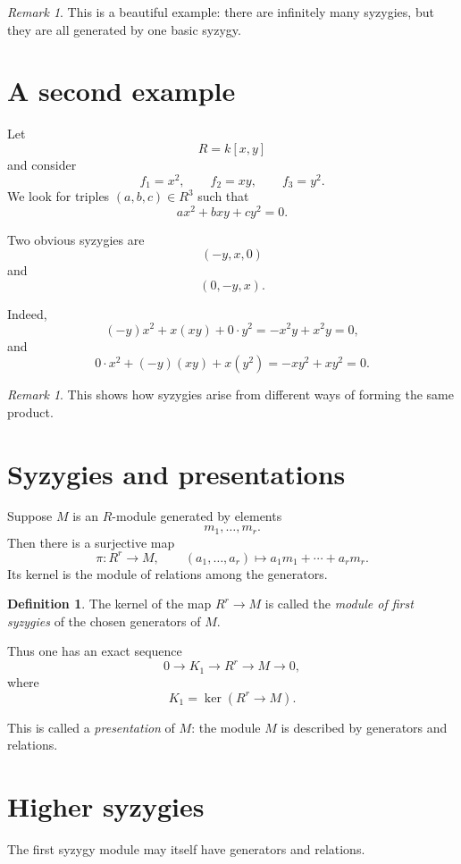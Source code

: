 \documentclass[11pt]{article}
\theoremstyle{definition}
\newtheorem{definition}[theorem]{Definition}
\theoremstyle{remark}
\newtheorem{remark}[theorem]{Remark}
\newcommand{\kerR}{\operatorname{ker}}
\begin{document}
	\begin{remark}
		This is a beautiful example: there are infinitely many syzygies, but they are all generated by one basic syzygy.
	\end{remark}
	
	\section{A second example}
	
	Let
	\[
	R=k[x,y]
	\]
	and consider
	\[
	f_1=x^2,\qquad f_2=xy,\qquad f_3=y^2.
	\]
	We look for triples \((a,b,c)\in R^3\) such that
	\[
	ax^2+bxy+cy^2=0.
	\]
	
	Two obvious syzygies are
	\[
	(-y,x,0)
	\]
	and
	\[
	(0,-y,x).
	\]
	
	Indeed,
	\[
	(-y)x^2+x(xy)+0\cdot y^2=-x^2y+x^2y=0,
	\]
	and
	\[
	0\cdot x^2+(-y)(xy)+x(y^2)=-xy^2+xy^2=0.
	\]
	
	\begin{remark}
		This shows how syzygies arise from different ways of forming the same product.
	\end{remark}
	
	\section{Syzygies and presentations}
	
	Suppose \(M\) is an \(R\)-module generated by elements
	\[
	m_1,\dots,m_r.
	\]
	Then there is a surjective map
	\[
	\pi:R^r\to M,
	\qquad
	(a_1,\dots,a_r)\mapsto a_1m_1+\cdots+a_rm_r.
	\]
	Its kernel is the module of relations among the generators.
	
	\begin{definition}
		The kernel of the map \(R^r\to M\) is called the \emph{module of first syzygies} of the chosen generators of \(M\).
	\end{definition}
	
	Thus one has an exact sequence
	\[
	0\to K_1\to R^r\to M\to 0,
	\]
	where
	\[
	K_1=\kerR(R^r\to M).
	\]
	
	This is called a \emph{presentation} of \(M\): the module \(M\) is described by generators and relations.
	
	\section{Higher syzygies}
	
	The first syzygy module may itself have generators and relations.
	
\end{document}
